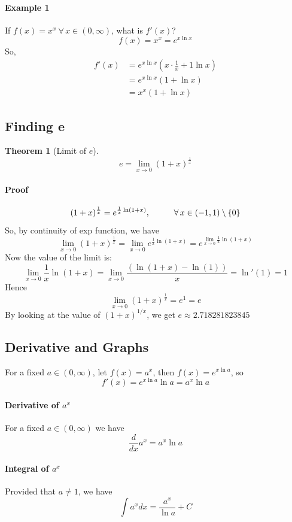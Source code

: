 \documentclass[12pt]{article}
\newcommand\tab[1][1cm]{\hspace*{#1}}
\newtheorem{theorem}{Theorem}
\begin{document}
\paragraph{Example 1} If $f(x) = x^x \: \forall \, x \in (0, \infty)$, what is $f'(x)$?
\[
    f(x) = x^x = e^{x \ln x}
\]
So, 
\begin{align*} 
    f'(x) &= e^{x \ln x} \left( x \cdot \frac{1}{x} + 1 \ln x \right) \\
    &= e^{x \ln x} (1 + \ln x) \\
    &= x^x (1 + \ln x)
\end{align*}

\subsection{Finding e}
\begin{theorem}[Limit of $e$]
    \[
        e = \lim_{x \to 0} (1 + x)^{\frac{1}{x}}
    \]
\end{theorem}

\paragraph{Proof}
\[
    (1 + x)^{\frac{1}{x}} = e^{\frac{1}{x} \ln (1 + x)}, \textrm{\tab} \forall \, x \in (-1, 1) \setminus \{0\}
\]
So, by continuity of exp function, we have
\[
    \lim_{x \to 0} (1 + x)^{\frac{1}{x}} = \lim_{x \to 0} e^{\frac{1}{x} \ln (1 + x)} = e^{\lim_{x \to 0} \frac{1}{x} \ln (1 + x)}
\]
Now the value of the limit is:
\[
    \lim_{x \to 0} \frac{1}{x} \ln (1 + x) = \lim_{x \to 0} \frac{(\ln(1 + x) - \ln (1))}{x} = \ln'(1) = 1 
\]
Hence
\[
    \lim_{x \to 0} (1 + x)^{\frac{1}{x}} = e^1 = e
\]
By looking at the value of $(1 + x)^{1/x}$, we get $e \approx 2.718281823845$

\subsection{Derivative and Graphs}
For a fixed $a \in (0, \infty)$, let $f(x) = a^x$, then $f(x) = e^{x \ln a}$, so
\[
    f'(x) = e^{x \ln a} \ln a = a^x \ln a
\]

\paragraph{Derivative of $a^x$} For a fixed $a \in (0, \infty)$ we have
\[
    \frac{d}{dx} a^x = a^x \ln a
\]

\paragraph{Integral of $a^x$} Provided that $a \neq 1$, we have
\[
    \int a^x dx = \frac{a^x}{\ln a} + C
\]
\end{document}
